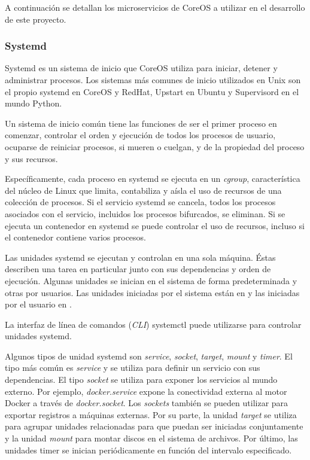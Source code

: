 A continuación se detallan los microservicios de CoreOS a utilizar en el desarrollo de este proyecto.

\subsubsection{Systemd}

Systemd es un sistema de inicio que CoreOS utiliza para iniciar, detener y administrar procesos. Los sistemas más comunes de inicio utilizados en Unix son el propio systemd en CoreOS y RedHat, Upstart en Ubuntu y Supervisord en el mundo Python.

Un sistema de inicio común tiene las funciones de ser el primer proceso en comenzar, controlar el orden y ejecución de todos los procesos de usuario, ocuparse de reiniciar procesos, si mueren o cuelgan, y de la propiedad del proceso y sus recursos.

Específicamente, cada proceso en systemd se ejecuta en un \textit{cgroup}, característica del núcleo de Linux que limita, contabiliza y aísla el uso de recursos de una colección de procesos. Si el servicio systemd se cancela, todos los procesos asociados con el servicio, incluidos los procesos bifurcados, se eliminan. Si se ejecuta un contenedor en systemd se puede controlar el uso de recursos, incluso si el contenedor contiene varios procesos.
 
Las unidades systemd se ejecutan y controlan en una sola máquina. Éstas describen una tarea en particular junto con sus dependencias y orden de ejecución. Algunas unidades se inician en el sistema de forma predeterminada y otras por usuarios. Las unidades iniciadas por el sistema están en  y las iniciadas por el usuario en .

La interfaz de línea de comandos (\textit{CLI}) systemctl puede utilizarse para controlar unidades systemd.

Algunos tipos de unidad systemd son \textit{service}, \textit{socket}, \textit{target}, \textit{mount} y \textit{timer}. El tipo más común es \textit{service} y se utiliza para definir un servicio con sus dependencias. El tipo \textit{socket} se utiliza para exponer los servicios al mundo externo. Por ejemplo, \textit{docker.service} expone la conectividad externa al motor Docker a través de \textit{docker.socket}. Los \textit{sockets} también se pueden utilizar para exportar registros a máquinas externas. Por su parte, la unidad \textit{target} se utiliza para agrupar unidades relacionadas para que puedan ser iniciadas conjuntamente y la unidad \textit{mount} para montar discos en el sistema de archivos. Por último, las unidades timer se inician periódicamente en función del intervalo especificado.

